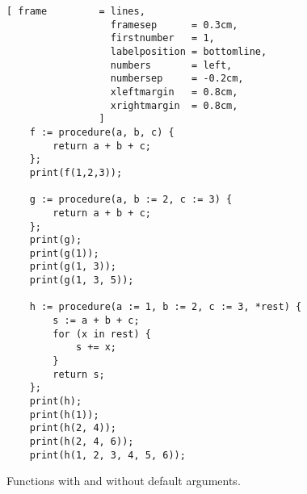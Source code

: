 \begin{figure}[!ht]
\centering
\begin{Verbatim}[ frame         = lines, 
                  framesep      = 0.3cm, 
                  firstnumber   = 1,
                  labelposition = bottomline,
                  numbers       = left,
                  numbersep     = -0.2cm,
                  xleftmargin   = 0.8cm,
                  xrightmargin  = 0.8cm,
                ]
    f := procedure(a, b, c) {
        return a + b + c;
    };
    print(f(1,2,3));
    
    g := procedure(a, b := 2, c := 3) {
        return a + b + c;
    };
    print(g);
    print(g(1));
    print(g(1, 3));
    print(g(1, 3, 5));
    
    h := procedure(a := 1, b := 2, c := 3, *rest) {
        s := a + b + c;
        for (x in rest) {
            s += x;
        }
        return s;
    };
    print(h);
    print(h(1));
    print(h(2, 4));
    print(h(2, 4, 6));
    print(h(1, 2, 3, 4, 5, 6));
\end{Verbatim}
\vspace*{-0.3cm}
\caption{Functions with and without default arguments.}
\label{fig:functions.stlx}
\end{figure}

